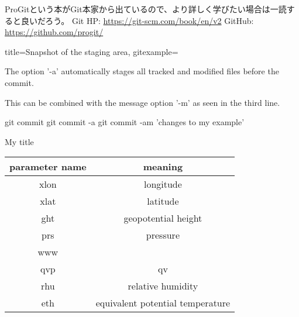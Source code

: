 \documentclass[10pt,a4j,openany,dvipdfmx]{jsarticle}
\begin{document}
\begin{redbox}
ProGitという本がGit本家から出ているので、より詳しく学びたい場合は一読すると良いだろう。
\tcblower
Git HP: \url{https://git-scm.com/book/en/v2}
GitHub: \url{https://github.com/progit/}
\end{redbox}




\begin{tcblisting}{title={Snapshot of the staging area},
gitexample={The option '-a' automatically stages all tracked and modified
files before the commit.\par
This can be combined with the message option '-m'
as seen in the third line.}}
git commit
git commit -a
git commit -am 'changes to my example'
\end{tcblisting}


\begin{myfilebox}[colbacktitle=RoyalBlue]{My title}
\lipsum[2]
\end{myfilebox}


\begin{table}[H]
  \centering
  \begin{tabular}{|c|c|} \hline
      parameter name & meaning\\ \hline \hline
      xlon & longitude\\
      xlat & latitude\\
      ght  & geopotential height\\
      prs  & pressure\\
      www  & \\
      qvp  & qv\\
      rhu  & relative humidity\\ 
      eth  & equivalent potential temperature\\ \hline
  \end{tabular}
\end{table}


\end{document}
